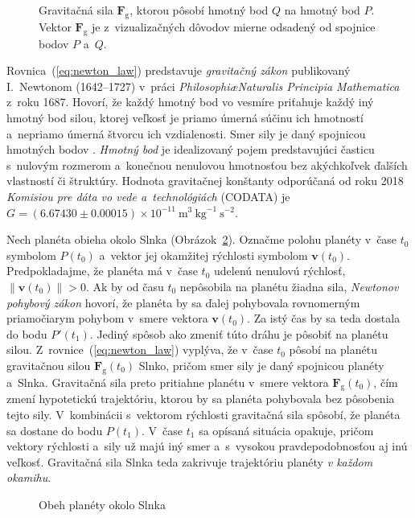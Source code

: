 \documentclass[a4paper,12pt]{book}
\newcommand{\gidx}{\mathrm g}
\let\vec\mathbf
\begin{document}
\begin{figure}[b]
\centering

\caption{Gravitačná sila $\vec F_\gidx$, ktorou pôsobí hmotný bod $Q$ na hmotný 
bod $P$.  Vektor $\vec F_\gidx$ je z~vizualizačných dôvodov mierne odsadený od 
spojnice bodov $P$ a~$Q$.}
\label{fig:newton_law}
\end{figure}

Rovnica~(\ref{eq:newton_law}) predstavuje \emph{gravitačný zákon} publikovaný
I.~Newtonom (1642--1727) v~práci \emph{Philosophi\ae Naturalis Principia
Mathematica} z~roku 1687.  Hovorí, že každý hmotný bod vo vesmíre priťahuje
každý iný hmotný bod silou, ktorej veľkosť je priamo úmerná súčinu ich 
hmotností a~nepriamo úmerná štvorcu ich vzdialenosti.  Smer sily je daný 
spojnicou hmotných bodov \parencite{Kellogg1967}.  \emph{Hmotný bod} je 
idealizovaný pojem predstavujúci časticu s~nulovým rozmerom a~konečnou 
nenulovou hmotnosťou bez akýchkoľvek ďalších vlastností či štruktúry.  Hodnota 
gravitačnej konštanty odporúčaná od roku 2018 \emph{Komisiou pre dáta vo vede 
a~technológiách} (CODATA) je $G = (6.67430 \pm 0.00015) \times 10^{-11} 
\ \mathrm{m}^3 \ \mathrm{kg}^{-1} \ \mathrm{s}^{-2}$.

Nech planéta obieha okolo Slnka (Obrázok~\ref{fig:orbital_motion}).  Označme 
polohu planéty v~čase $t_0$ symbolom $P(t_0)$ a~vektor jej okamžitej rýchlosti 
symbolom $\vec v(t_0)$.  Predpokladajme, že planéta má v~čase $t_0$ udelenú 
nenulovú rýchlosť, $\| \vec v(t_0) \| > 0$.  Ak by od času $t_0$ nepôsobila na 
planétu žiadna sila, \emph{Newtonov pohybový zákon} hovorí, že planéta by sa 
ďalej pohybovala rovnomerným priamočiarym pohybom v~smere vektora $\vec 
v(t_0)$.  Za istý čas by sa teda dostala do bodu $P'(t_1)$.  Jediný spôsob ako 
zmeniť túto dráhu je pôsobiť na planétu silou.  Z~rovnice~(\ref{eq:newton_law}) 
vyplýva, že v~čase $t_0$ pôsobí na planétu gravitačnou silou $\vec 
F_\gidx(t_0)$ Slnko, pričom smer sily je daný spojnicou planéty a~Slnka.  
Gravitačná sila preto pritiahne planétu v~smere vektora $\vec F_\gidx(t_0)$, 
čím zmení hypotetickú trajektóriu, ktorou by sa planéta pohybovala bez 
pôsobenia tejto sily.  V~kombinácii s~vektorom rýchlosti gravitačná sila 
spôsobí, že planéta sa dostane do bodu $P(t_1)$.  V~čase $t_1$ sa opísaná 
situácia opakuje, pričom vektory rýchlosti a~sily už majú iný smer a~s~vysokou 
pravdepodobnosťou aj inú veľkosť.  Gravitačná sila Slnka teda zakrivuje 
trajektóriu planéty \emph{v každom okamihu}.

\begin{figure}
\centering

\caption{Obeh planéty okolo Slnka}
\label{fig:orbital_motion}
\end{figure}
\end{document}
